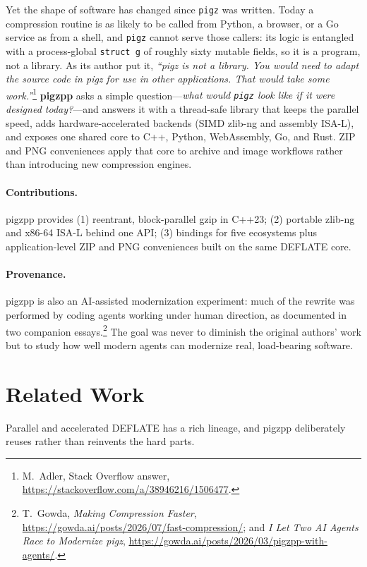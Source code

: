 \documentclass{pigzpp-whitepaper}
\begin{document}
Yet the shape of software has changed since \texttt{pigz} was written. Today a
compression routine is as likely to be called from Python, a browser, or a Go
service as from a shell, and \texttt{pigz} cannot serve those callers: its logic
is entangled with a process-global \texttt{struct g} of roughly sixty mutable
fields, so it is a program, not a library. As its author put it,
\emph{``pigz is not a library. You would need to adapt the source code in pigz
for use in other applications. That would take some work.''}\footnote{M.~Adler,
Stack Overflow answer, \url{https://stackoverflow.com/a/38946216/1506477}.}
\textbf{pigzpp} asks a simple question---\emph{what would \texttt{pigz} look
like if it were designed today?}---and answers it with a thread-safe library
that keeps the parallel speed, adds hardware-accelerated backends (SIMD zlib-ng
and assembly ISA-L), and exposes one shared core to C++, Python,
Web\-Assembly, Go, and Rust. ZIP and PNG conveniences apply that core to archive
and image workflows rather than introducing new compression engines.

\paragraph{Contributions.} pigzpp provides (1) reentrant, block-parallel gzip in
C++23; (2) portable zlib-ng and x86-64 ISA-L behind one API; (3) bindings for
five ecosystems plus application-level ZIP and PNG conveniences built on the
same DEFLATE core.

\paragraph{Provenance.} pigzpp is also an AI-assisted modernization experiment:
much of the rewrite was performed by coding agents working under human direction,
as documented in two companion essays.\footnote{T.~Gowda, \emph{Making Compression
Faster}, \url{https://gowda.ai/posts/2026/07/fast-compression/}; and \emph{I Let
Two AI Agents Race to Modernize pigz},
\url{https://gowda.ai/posts/2026/03/pigzpp-with-agents/}.} The goal was never to
diminish the original authors' work but to study how well modern agents can
modernize real, load-bearing software.

\section{Related Work}
Parallel and accelerated DEFLATE has a rich lineage, and pigzpp deliberately
reuses rather than reinvents the hard parts.
\end{document}
